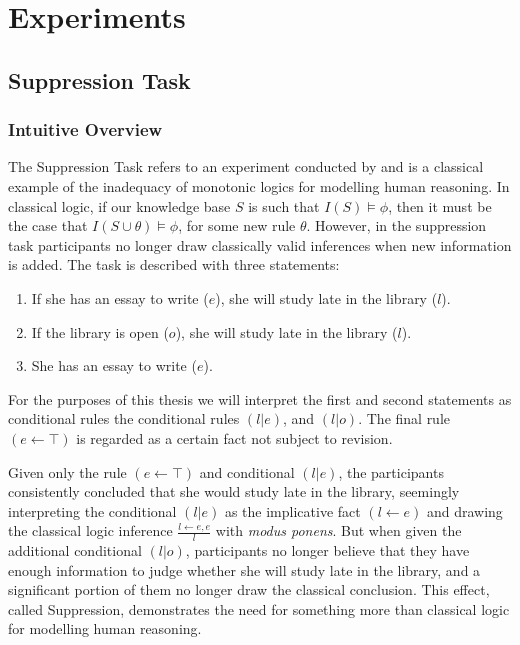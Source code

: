\chapter{Experiments} \label{chp:experiments}
\section{Suppression Task} \label{sec:sup}
\subsection{Intuitive Overview} \label{ssec:sup_intuition}
The Suppression Task refers to an experiment conducted by \cite{byrne1989suppressing} and is a classical example of the inadequacy of monotonic logics for modelling human reasoning. In classical logic, if our knowledge base $S$ is such that $I(S) \models \phi$, then it must be the case that $I(S \cup \theta) \models \phi$, for some new rule $\theta$. However, in the suppression task participants no longer draw classically valid inferences when new information is added. The task is described with three statements:

\begin{enumerate}
\item If she has an essay to write ($e$), she will study late in the library ($l$).
\item If the library is open ($o$), she will study late in the library ($l$).
\item She has an essay to write ($e$).
\end{enumerate}

For the purposes of this thesis we will interpret the first and second statements as conditional rules the conditional rules $(l|e)$, and $(l|o)$. The final rule $(e \leftarrow \top)$ is regarded as a certain fact not subject to revision.

Given only the rule $(e\leftarrow \top)$ and conditional $(l|e)$, the participants consistently concluded that she would study late in the library, seemingly interpreting the conditional $(l|e)$ as the implicative fact $(l\leftarrow e)$ and drawing the classical logic inference $\frac{l \leftarrow e, e}{l}$ with \textit{modus ponens}. But when given the additional conditional $(l|o)$, participants no longer believe that they have enough information to judge whether she will study late in the library, and a significant portion of them no longer draw the classical conclusion. This effect, called Suppression, demonstrates the need for something more than classical logic for modelling human reasoning.

